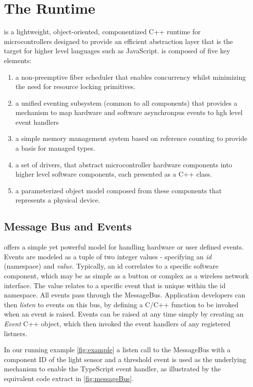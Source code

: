 \section{The \CO Runtime}
\label{sec:codal}

\CO is a lightweight, object-oriented, componentized C++ runtime for microcontrollers designed to provide an efficient abstraction layer that is the target for higher level languages such as JavaScript. \CO is composed of five key elements:

\begin{enumerate} 
\item a non-preemptive fiber scheduler that enables concurrency whilst minimizing the need for resource locking primitives.
\item a unified eventing subsystem (common to all components) that provides a mechanism to map hardware and software asynchronpus events to hgh level event handlers 
\item a simple memory management system based on reference counting to provide a basis for managed types.
\item a set of drivers, that abstract microcontroller hardware components into higher level software components, each presented as a C++ class.    
\item a parameterized object model composed from these components that represents a physical device.
\end{enumerate}

\subsection{Message Bus and Events}

\CO offers a simple yet powerful model for handling hardware or user defined events. Events are modeled as a tuple of two integer values - specifying an \emph{id} (namespace) and \emph{value}. 
Typically, an id correlates to a specific software component, which may be as simple as a button or complex as a wireless network interface. The value relates to a specific event that is unique within the id namespace. All events pass through the \CO MessageBus. Application developers can then \emph{listen} to events on this bus, by defining a C/C++ function to be invoked when an event is raised. Events can be raised at any time simply by creating an \emph{Event} C++ object, which then invoked the event handlers of any registered listners.

In our running example \ref{fig:example} a listen call to the MessageBus with a component ID of the light sensor and a threshold event is used as the underlying mechanism to enable the TypeScript event handler, as illustrated by the equivalent \CO code extract in \ref{fig:messageBus}. 

